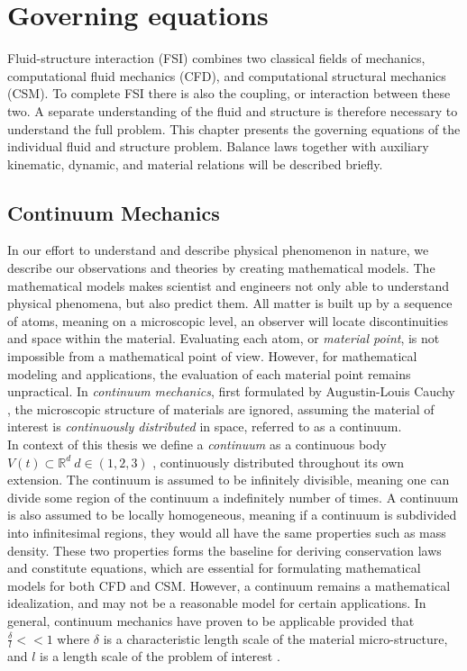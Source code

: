 \chapter{Governing equations}
Fluid-structure interaction (FSI) combines two classical fields of mechanics, computational fluid mechanics (CFD), and computational structural mechanics (CSM). To complete FSI there is also the coupling, or interaction between these two. A separate understanding of the fluid and structure is therefore necessary to understand the full problem. This chapter presents the governing equations of the individual fluid and structure problem. Balance laws together with auxiliary kinematic, dynamic, and material relations will be described briefly.

\section{Continuum Mechanics}
In our effort to understand and describe physical phenomenon in nature, we describe our observations and theories by creating mathematical models. The mathematical models makes scientist and engineers not only able to understand physical phenomena, but also predict them.  All matter is built up by a sequence of atoms, meaning on a microscopic level, an observer will locate discontinuities and space within the material. Evaluating each atom, or \textit{material point}, is not impossible from a mathematical point of view. However, for mathematical modeling and applications, the evaluation of each material point remains unpractical. In \textit{continuum mechanics}, first formulated by Augustin-Louis Cauchy \cite{Merodio2011}, the microscopic structure of materials are ignored,  assuming the material of interest is \textit{continuously distributed} in space, referred to as a continuum. \\
In context of this thesis we define a \textit{continuum} as a continuous body $V(t) \subset \mathbb{R}^d \ d \in (1, 2, 3)$ ,  continuously distributed throughout its own extension. The continuum is assumed to be infinitely divisible, meaning one can divide some region of the continuum a indefinitely number of times. A continuum is also assumed to be locally homogeneous, meaning if a continuum is subdivided into infinitesimal regions, they would all have the same properties such as mass density. These two properties forms the baseline for deriving conservation laws and constitute equations, which are essential for formulating mathematical models for both CFD and CSM. However, a continuum remains a mathematical idealization, and may not be a reasonable model for certain applications. In general, continuum mechanics have proven to be applicable provided that $\frac{\delta}{l} << 1$ where $\delta$ is a characteristic length scale of the material micro-structure, and $l$ is a length scale of the problem of interest \cite{Humphrey2002}.

